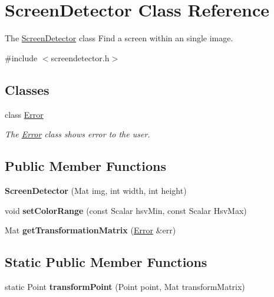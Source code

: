 \hypertarget{classScreenDetector}{}\section{Screen\+Detector Class Reference}
\label{classScreenDetector}


The \hyperlink{classScreenDetector}{Screen\+Detector} class Find a screen within an single image.  




{\ttfamily \#include $<$screendetector.\+h$>$}

\subsection*{Classes}
\begin{DoxyCompactItemize}
\item 
class \hyperlink{classScreenDetector_1_1Error}{Error}
\begin{DoxyCompactList}\small\item\em The \hyperlink{classScreenDetector_1_1Error}{Error} class shows error to the user. \end{DoxyCompactList}\end{DoxyCompactItemize}
\subsection*{Public Member Functions}
\begin{DoxyCompactItemize}
\item 
\hypertarget{classScreenDetector_ae50bccd225070510148f0029f1cbd20e}{}{\bfseries Screen\+Detector} (Mat img, int width, int height)\label{classScreenDetector_ae50bccd225070510148f0029f1cbd20e}

\item 
\hypertarget{classScreenDetector_a4672a5ef1fb5d4cad91cfa2bd3766df1}{}void {\bfseries set\+Color\+Range} (const Scalar hsv\+Min, const Scalar Hsv\+Max)\label{classScreenDetector_a4672a5ef1fb5d4cad91cfa2bd3766df1}

\item 
\hypertarget{classScreenDetector_aaa289b7819c43b4f9bff936253a99c81}{}Mat {\bfseries get\+Transformation\+Matrix} (\hyperlink{classScreenDetector_1_1Error}{Error} \&err)\label{classScreenDetector_aaa289b7819c43b4f9bff936253a99c81}

\end{DoxyCompactItemize}
\subsection*{Static Public Member Functions}
\begin{DoxyCompactItemize}
\item 
\hypertarget{classScreenDetector_a8a02bca5665ba2823c34afbe84490b54}{}static Point {\bfseries transform\+Point} (Point point, Mat transform\+Matrix)\label{classScreenDetector_a8a02bca5665ba2823c34afbe84490b54}

\end{DoxyCompactItemize}


